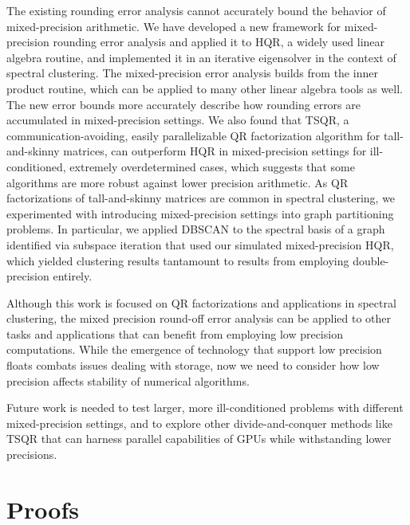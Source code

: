 \documentclass[review,onefignum,onetabnum]{siamart190516}
\begin{document}
The existing rounding error analysis cannot accurately bound the behavior of mixed-precision arithmetic.
We have developed a new framework for mixed-precision rounding error analysis and applied it to HQR, a widely used linear algebra routine, and implemented it in an iterative eigensolver in the context of spectral clustering. 
The mixed-precision error analysis builds from the inner product routine, which can be applied to many other linear algebra tools as well.
The new error bounds more accurately describe how rounding errors are accumulated in mixed-precision settings.
We also found that TSQR, a communication-avoiding, easily parallelizable QR factorization algorithm for tall-and-skinny matrices, can outperform HQR in mixed-precision settings for ill-conditioned, extremely overdetermined cases, which suggests that some algorithms are more robust against lower precision arithmetic.
As QR factorizations of tall-and-skinny matrices are common in spectral clustering, we experimented with introducing mixed-precision settings into graph partitioning problems.
In particular, we applied DBSCAN to the spectral basis of a graph identified via subspace iteration that used our simulated mixed-precision HQR, which yielded clustering results tantamount to results from employing double-precision entirely.\par

Although this work is focused on QR factorizations and applications in spectral clustering, the mixed precision round-off error analysis can be applied to other tasks and applications that can benefit from employing low precision computations. 
While the emergence of technology that support low precision floats combats issues dealing with storage, now we need to consider how low precision affects stability of numerical algorithms. 

Future work is needed to test larger, more ill-conditioned problems with different mixed-precision settings, and to explore other divide-and-conquer methods like TSQR that can harness parallel capabilities of GPUs while withstanding lower precisions. 

\appendix
\section{Proofs}


\end{document}
